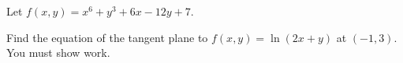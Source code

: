 \documentclass[addpoints]{exam}
\begin{document}
\begin{questions}
\question Let $f(x,y) = x^6 + y^3 + 6x - 12y + 7$.

\question[30] Find the equation of the tangent plane to $f(x,y) = \ln (2x + y)$ at $(-1,3)$. You must show work. 

\end{questions}
\end{document}
